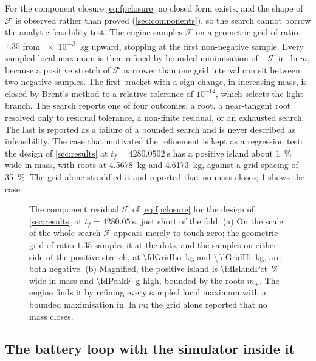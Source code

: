 For the component closure \cref{eq:fpclosure} no closed form exists, and the
shape of $\mathcal{F}$ is observed rather than proved (\cref{sec:components}),
so the search cannot borrow the analytic feasibility test. The engine samples
$\mathcal{F}$ on a geometric grid of ratio $1.35$ from \SI{e-3}{\kilo\gram}
upward, stopping at the first non-negative sample. Every sampled local maximum
is then refined by bounded minimisation of $-\mathcal{F}$ in $\ln m$, because a
positive stretch of $\mathcal{F}$ narrower than one grid interval can sit
between two negative samples. The first bracket with a sign change, in
increasing mass, is closed by Brent's method to a relative tolerance of
$10^{-12}$, which selects the light branch. The search reports one of four
outcomes: a root, a near-tangent root resolved only to residual tolerance, a
non-finite residual, or an exhausted search. The last is reported as a failure
of a bounded search and is never described as infeasibility. The case that
motivated the refinement is kept as a regression test: the design of
\cref{sec:results} at $t_f=\SI{4280.0502}{\second}$ has a positive island
about \SI{1}{\percent} wide in mass, with roots at \SI{4.5678}{\kilo\gram}
and \SI{4.6173}{\kilo\gram}, against a grid spacing of \SI{35}{\percent}.
The grid alone straddled it and reported that no mass closes;
\cref{fig:rootsearch} shows the case.

\begin{figure}[tbp]
\centering

\caption{The component residual $\mathcal{F}$ of \cref{eq:fpclosure} for the
design of \cref{sec:results} at $t_f=\SI{4280.05}{\second}$, just short of
the fold. (a) On the scale of the whole search $\mathcal{F}$ appears merely to
touch zero; the geometric grid of ratio $1.35$ samples it at the dots, and the
samples on either side of the positive stretch, at \SI{\fdGridLo}{\kilo\gram}
and \SI{\fdGridHi}{\kilo\gram}, are both negative. (b) Magnified, the positive
island is \SI{\fdIslandPct}{\percent} wide in mass and \SI{\fdPeakF}{\gram}
high, bounded by the roots $m_\pm$. The engine finds it by refining every
sampled local maximum with a bounded maximisation in $\ln m$; the grid alone
reported that no mass closes.}
\label{fig:rootsearch}
\end{figure}

\subsection{The battery loop with the simulator inside it}

